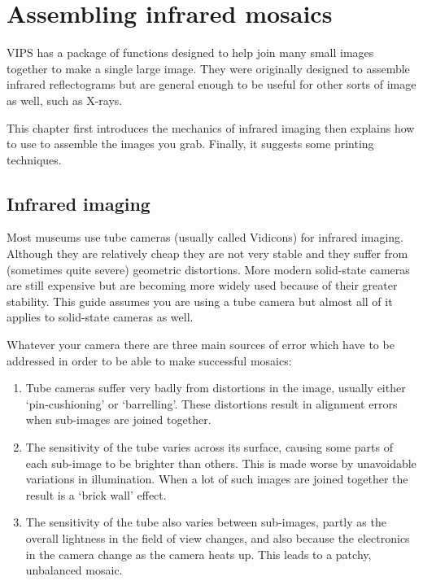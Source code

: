 \chapter{Assembling infrared mosaics}

VIPS has a package of functions designed to help join many small images
together to make a single large image. They were originally designed to
assemble infrared reflectograms but are general enough to be useful for
other sorts of image as well, such as X-rays.

This chapter first introduces the mechanics of infrared imaging then
explains how to use \nip{} to assemble the images you grab. Finally, it
suggests some printing techniques.

\section{Infrared imaging}

Most museums use tube cameras (usually called Vidicons) for infrared
imaging. Although they are relatively cheap they are not very stable
and they suffer from (sometimes quite severe) geometric distortions.
More modern solid-state cameras are still expensive but are becoming
more widely used because of their greater stability. This
guide assumes you are using a tube camera but almost all of it applies to
solid-state cameras as well.

Whatever your camera there are three main sources of error which have to be
addressed in order to be able to make successful mosaics:

\begin{enumerate}

\item
Tube cameras suffer very badly from distortions in the image, usually either
`pin-cushioning' or `barrelling'. These distortions result in alignment
errors when sub-images are joined together.

\item
The sensitivity of the tube varies across its surface, causing some parts of
each sub-image to be brighter than others. This is made worse by unavoidable
variations in illumination. When a lot of such images are joined together the
result is a `brick wall' effect.

\item
The sensitivity of the tube also varies between sub-images, partly as
the overall lightness in the field of view changes, and also because the
electronics in the camera change as the camera heats up. This leads to a
patchy, unbalanced mosaic.

\end{enumerate}

